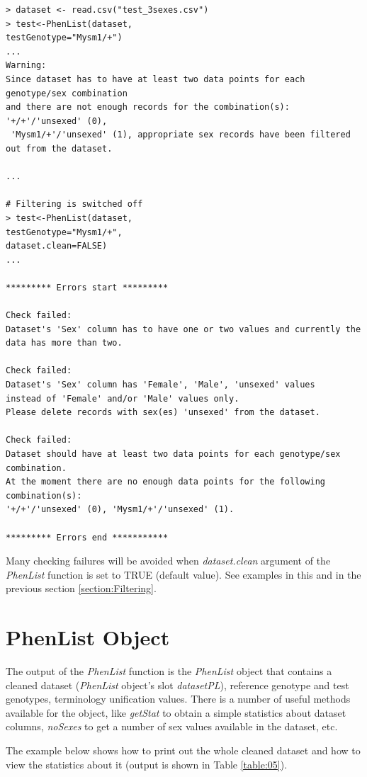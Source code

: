 \documentclass[12pt,a4paper]{article}
\begin{document}
\begingroup
    \fontsize{8pt}{12pt}\selectfont
\begin{verbatim}
> dataset <- read.csv("test_3sexes.csv")
> test<-PhenList(dataset,
testGenotype="Mysm1/+")
...
Warning:
Since dataset has to have at least two data points for each genotype/sex combination 
and there are not enough records for the combination(s): '+/+'/'unsexed' (0),
 'Mysm1/+'/'unsexed' (1), appropriate sex records have been filtered out from the dataset.

...

# Filtering is switched off
> test<-PhenList(dataset,
testGenotype="Mysm1/+",
dataset.clean=FALSE)
...

********* Errors start *********

Check failed:
Dataset's 'Sex' column has to have one or two values and currently the data has more than two.

Check failed:
Dataset's 'Sex' column has 'Female', 'Male', 'unsexed' values 
instead of 'Female' and/or 'Male' values only. 
Please delete records with sex(es) 'unsexed' from the dataset.

Check failed:
Dataset should have at least two data points for each genotype/sex combination. 
At the moment there are no enough data points for the following combination(s): 
'+/+'/'unsexed' (0), 'Mysm1/+'/'unsexed' (1).

********* Errors end ***********

\end{verbatim}
\endgroup

Many checking failures will be avoided when \textit{dataset.clean} argument of the \textit{PhenList} function is set to TRUE (default value). See examples in this and in the previous section \ref{section:Filtering}.

\section{PhenList Object}
The output of the \textit{PhenList} function is the \textit{PhenList} object that contains a cleaned dataset (\textit{PhenList} object's slot \textit{datasetPL}), reference genotype and test genotypes, terminology unification values. There is a number of useful methods available for the object, like \textit{getStat} to obtain a simple statistics about dataset columns, \textit{noSexes} to get a number of sex values available in the dataset, etc.

The example below shows how to print out the whole cleaned dataset and how to view the statistics about it (output is shown in Table \ref{table:05}). 
\end{document}
